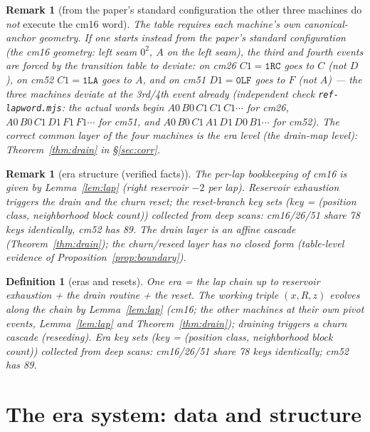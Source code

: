 \documentclass[11pt]{amsart}
\newtheorem{definition}[theorem]{Definition}
\newtheorem{remark}[theorem]{Remark}
\begin{document}
\begin{remark}[from the paper's standard configuration the other three machines do \emph{not} execute the cm16 word]\label{rem:lapdiff}
The table requires each machine's \emph{own} canonical-anchor geometry. If one starts instead from the paper's standard configuration (the cm16 geometry: left seam $0^2$, $A$ on the left seam), the third and fourth events are forced by the transition table to deviate: on cm26 $C1=\texttt{1RC}$ goes to $C$ (not $D$), on cm52 $C1=\texttt{1LA}$ goes to $A$, and on cm51 $D1=\texttt{0LF}$ goes to $F$ (not $A$) --- the three machines deviate at the 3rd/4th event already (independent check \texttt{ref-lapword.mjs}: the actual words begin $A0\,B0\,C1\,C1\,C1\cdots$ for cm26, $A0\,B0\,C1\,D1\,F1\,F1\cdots$ for cm51, and $A0\,B0\,C1\,A1\,D1\,D0\,B1\cdots$ for cm52). The correct common layer of the four machines is the \emph{era level} (the drain-map level): Theorem~\ref{thm:drain} in \S\ref{sec:corr}.
\end{remark}

\begin{remark}[era structure (verified facts)]
The per-lap bookkeeping of cm16 is given by Lemma~\ref{lem:lap} (right reservoir $-2$ per lap). Reservoir exhaustion triggers the drain and the churn reset; the reset-branch key sets (key = (position class, neighborhood block count)) collected from deep scans: cm16/26/51 share 78 keys identically, cm52 has 89. The drain layer is an affine cascade (Theorem~\ref{thm:drain}); the churn/reseed layer has no closed form (table-level evidence of Proposition~\ref{prop:boundary}).
\end{remark}

\begin{definition}[eras and resets]
One era = the lap chain up to reservoir exhaustion + the drain routine + the reset. The working triple $(x,R,z)$ evolves along the chain by Lemma~\ref{lem:lap} (cm16; the other machines at their own pivot events, Lemma~\ref{lem:lap} and Theorem~\ref{thm:drain}); draining triggers a churn cascade (reseeding). Era key sets (key = (position class, neighborhood block count)) collected from deep scans: cm16/26/51 share 78 keys identically; cm52 has 89.
\end{definition}

\section{The era system: data and structure}
\end{document}
